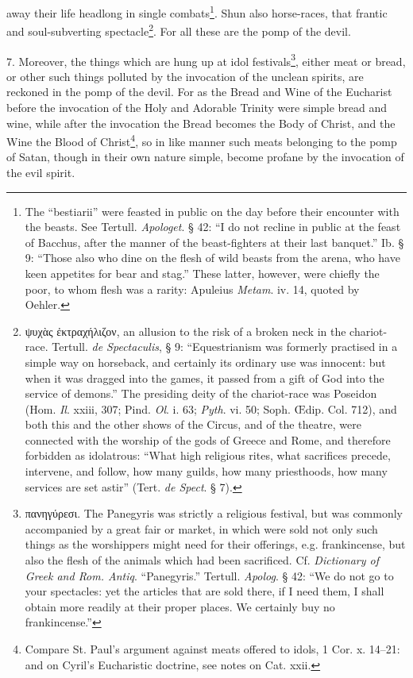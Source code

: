 away their life headlong in single combats\footnote{The “bestiarii” were feasted in public on the day before their encounter with the beasts. See Tertull. \emph{Apologet}. § 42: “I do not recline in public at the feast of Bacchus, after the manner of the beast-fighters at their last banquet.” Ib. § 9: “Those also who dine on the flesh of wild beasts from the arena, who have keen appetites for bear and stag.” These latter, however, were chiefly the poor, to whom flesh was a rarity: Apuleius \emph{Metam}. iv. 14, quoted by Oehler.}. Shun also horse-races, that frantic and soul-subverting spectacle\footnote{\textgreek{ψυχὰς ἐκτραχήλιζον}, an allusion to the risk of a broken neck in the chariot-race. Tertull. \emph{de Spectaculis}, § 9: “Equestrianism was formerly practised in a simple way on horseback, and certainly its ordinary use was innocent: but when it was dragged into the games, it passed from a gift of God into the service of demons.” The presiding deity of the chariot-race was Poseidon (Hom. \emph{Il}. xxiii, 307; Pind. \emph{Ol}. i. 63; \emph{Pyth}. vi. 50; Soph. Œdip. Col. 712), and both this and the other shows of the Circus, and of the theatre, were connected with the worship of the gods of Greece and Rome, and therefore forbidden as idolatrous: “What high religious rites, what sacrifices precede, intervene, and follow, how many guilds, how many priesthoods, how many services are set astir” (Tert. \emph{de Spect}. § 7).}. For all these are the pomp of the devil.

7. Moreover, the things which are hung up at idol festivals\footnote{\textgreek{πανηγύρεσι}. The Panegyris was strictly a religious festival, but was commonly accompanied by a great fair or market, in which were sold not only such things as the worshippers might need for their offerings, e.g. frankincense, but also the flesh of the animals which had been sacrificed. Cf. \emph{Dictionary of Greek and Rom. Antiq}. “Panegyris.” Tertull. \emph{Apolog}. § 42: “We do not go to your spectacles: yet the articles that are sold there, if I need them, I shall obtain more readily at their proper places. We certainly buy no frankincense.”}, either meat or bread, or other such things polluted by the invocation of the unclean spirits, are reckoned in the pomp of the devil. For as the Bread and Wine of the Eucharist before the invocation of the Holy and Adorable Trinity were simple bread and wine, while after the invocation the Bread becomes the Body of Christ, and the Wine the Blood of Christ\footnote{Compare St. Paul’s argument against meats offered to idols, 1 Cor. x. 14–21: and on Cyril’s Eucharistic doctrine, see notes on Cat. xxii.}, so in like manner such meats belonging to the pomp of Satan, though in their own nature simple, become profane by the invocation of the evil spirit.

